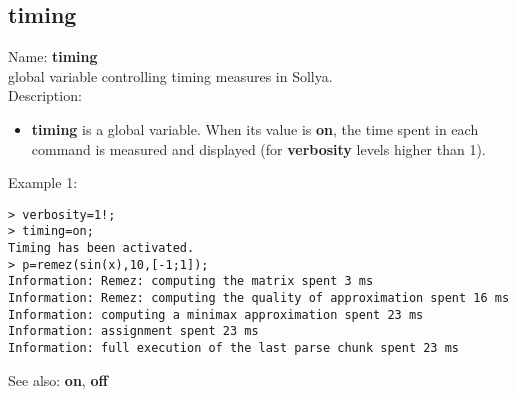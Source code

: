 \subsection{ timing }
\noindent Name: \textbf{timing}\\
global variable controlling timing measures in Sollya.\\

\noindent Description: \begin{itemize}

\item \textbf{timing} is a global variable. When its value is \textbf{on}, the time spent in each 
   command is measured and displayed (for \textbf{verbosity} levels higher than 1).
\end{itemize}
\noindent Example 1: 
\begin{center}\begin{minipage}{15cm}\begin{Verbatim}[frame=single]
> verbosity=1!;
> timing=on;
Timing has been activated.
> p=remez(sin(x),10,[-1;1]);
Information: Remez: computing the matrix spent 3 ms
Information: Remez: computing the quality of approximation spent 16 ms
Information: computing a minimax approximation spent 23 ms
Information: assignment spent 23 ms
Information: full execution of the last parse chunk spent 23 ms
\end{Verbatim}
\end{minipage}\end{center}
See also: \textbf{on}, \textbf{off}
